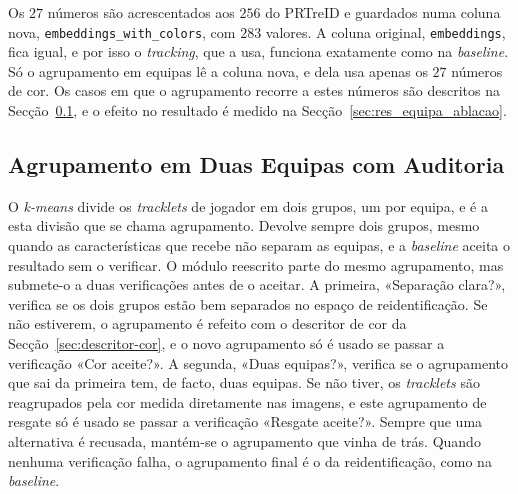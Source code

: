 Os $27$ números são acrescentados aos $256$ do PRTreID e guardados numa coluna nova, \texttt{embeddings\_\allowbreak with\_\allowbreak colors}, com $283$ valores. A coluna original, \texttt{embeddings}, fica igual, e por isso o \emph{tracking}, que a usa, funciona exatamente como na \emph{baseline}. Só o agrupamento em equipas lê a coluna nova, e dela usa apenas os $27$ números de cor. Os casos em que o agrupamento recorre a estes números são descritos na Secção~\ref{sec:agrupamento}, e o efeito no resultado é medido na Secção~\ref{sec:res_equipa_ablacao}.

\subsection{Agrupamento em Duas Equipas com Auditoria}\label{sec:agrupamento}

O \emph{k-means} divide os \emph{tracklets} de jogador em dois grupos, um por equipa, e é a esta divisão que se chama agrupamento. Devolve sempre dois grupos, mesmo quando as características que recebe não separam as equipas, e a \emph{baseline} aceita o resultado sem o verificar. O módulo reescrito parte do mesmo agrupamento, mas submete-o a duas verificações antes de o aceitar. A primeira, «Separação clara?», verifica se os dois grupos estão bem separados no espaço de reidentificação. Se não estiverem, o agrupamento é refeito com o descritor de cor da Secção~\ref{sec:descritor-cor}, e o novo agrupamento só é usado se passar a verificação «Cor aceite?». A segunda, «Duas equipas?», verifica se o agrupamento que sai da primeira tem, de facto, duas equipas. Se não tiver, os \emph{tracklets} são reagrupados pela cor medida diretamente nas imagens, e este agrupamento de resgate só é usado se passar a verificação «Resgate aceite?». Sempre que uma alternativa é recusada, mantém-se o agrupamento que vinha de trás. Quando nenhuma verificação falha, o agrupamento final é o da reidentificação, como na \emph{baseline}.

